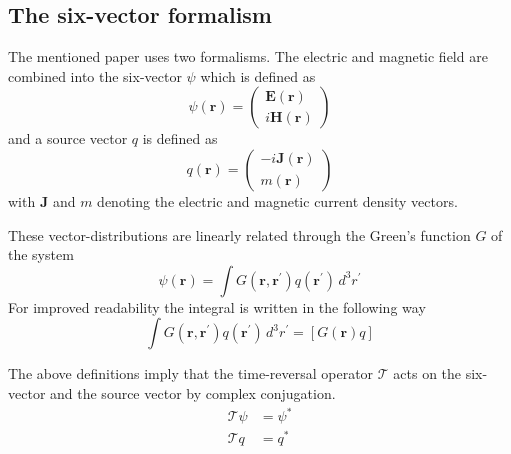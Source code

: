 \subsection{The six-vector formalism}
The mentioned paper uses two formalisms.
The electric and magnetic field are combined into the  six-vector \(\psi \) which is defined as
\begin{equation}
    \psi(\bm{r}) = \begin{pmatrix}
        \bm{E}(\bm{r}) \\
        i \bm{H}(\bm{r})
    \end{pmatrix}
\end{equation}
and a source vector \(q\) is defined as
\begin{equation}
    q(\bm{r}) = \begin{pmatrix}
        -i \bm{J}(\bm{r}) \\
        m(\bm{r})
    \end{pmatrix}
\end{equation}
with \(\bm{J}\) and \(m\) denoting the electric and magnetic current density vectors.

These vector-distributions are linearly related through the Green's function \(G\) of the system
\begin{equation}
    \psi(\bm{r}) = \int G(\bm{r}, \bm{r}^{\prime}) q(\bm{r}^{\prime}) \, d^3 r^{\prime}
\end{equation}
For improved readability the integral is written in the following way
\begin{equation}
    \int G(\bm{r}, \bm{r}^{\prime}) q(\bm{r}^{\prime}) \, d^3 r^{\prime} = [G(\bm{r}) q]
\end{equation}

The above definitions imply that the time-reversal operator \(\mathcal{T}\) acts on the six-vector and the source vector by complex conjugation.
\begin{align}
    \mathcal{T}\psi &= \psi^* \\
    \mathcal{T}q &= q^*
\end{align}

